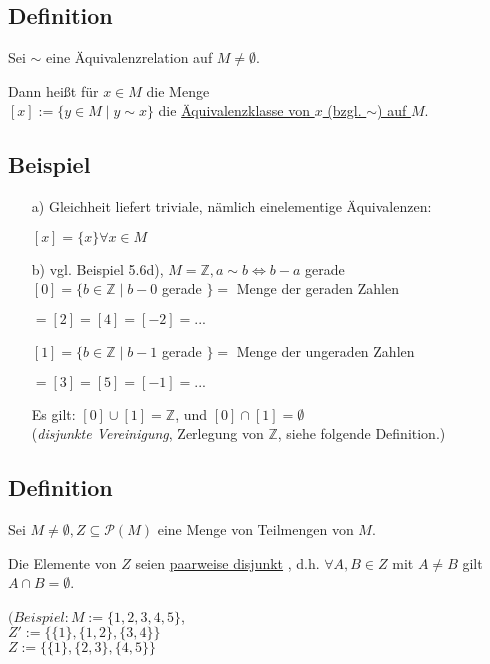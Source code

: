 \documentclass[a4paper, 12pt, twoside] {article}
\begin{document}
\subsection[Definition (Äquivalenzklassen)]{Definition} %
Sei $\sim$ eine Äquivalenzrelation auf $M \neq \emptyset$.

Dann heißt für $x \in M$ die Menge \\
$[x] := \{y \in M \mid y \sim x \}$ die \underline{Äquivalenzklasse von $x$ (bzgl. $\sim$) auf $M$}.

\subsection{Beispiel} %

\begin{itemize}
\item[a)] Gleichheit liefert triviale, nämlich einelementige Äquivalenzen:

$[x] = \{x\} \forall x \in M$

\item[b)] vgl. Beispiel 5.6d), $M = \mathbb{Z}, a \sim b \Leftrightarrow b-a$ gerade \\
$[0] = \{b \in \mathbb{Z} \mid b-0$ gerade $\} = $ Menge der geraden Zahlen

\qquad $= [2] = [4] = [-2] = ...$

$[1] = \{b \in \mathbb{Z} \mid b-1$ gerade $\} = $ Menge der ungeraden Zahlen

\qquad $= [3] = [5] = [-1] = ...$

Es gilt: $[0] \cup [1] = \mathbb{Z}$, und $[0] \cap [1] = \emptyset$ \\
(\textit{disjunkte Vereinigung}, Zerlegung von $\mathbb{Z}$, siehe folgende Definition.)
\end{itemize}

\subsection[Definition (paarweise disjunkte Mengen, disjunkte Vereinigung, Zerlegung/Partition)]{Definition} %
Sei $M \neq \emptyset, Z \subseteq \mathcal{P}(M)$ eine Menge von Teilmengen von $M$.

Die Elemente von $Z$ seien \underline{paarweise disjunkt} , d.h. $\forall A, B \in Z$ mit $A \neq B$ gilt $A \cap B = \emptyset$.

$(Beispiel: M := \{1, 2, 3, 4, 5\}$, \\
$Z' := \{\{1\}, \{1, 2\}, \{3, 4\}\}$ \\
$Z := \{\{1\}, \{2, 3\}, \{4, 5\}\}$ \\
\end{document}
